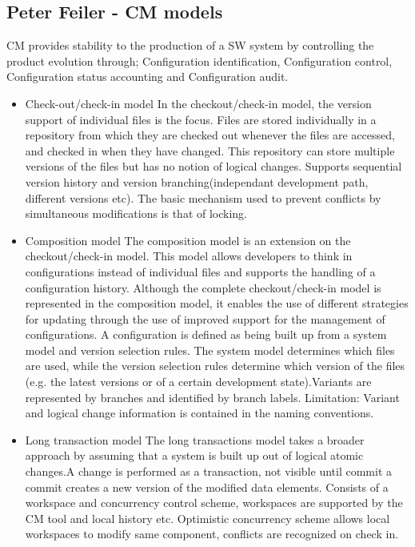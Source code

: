 \subsection{Peter Feiler - CM models}
CM provides stability to the production of a SW system by controlling the product evolution through; Configuration identification, Configuration control, Configuration status accounting and Configuration audit.
\begin{itemize}
    \item Check-out/check-in model
    In the checkout/check-in model, the version support of individual files is the focus. Files are stored individually in a repository from which they are checked out whenever the files are accessed, and checked in when they have changed.
    This repository can store multiple versions of the files but has no notion of logical changes. Supports sequential version history and version branching(independant development path, different versions etc).
    The basic mechanism used to prevent conflicts by simultaneous modifications is that of locking.
    \item Composition model 
    The composition model is an extension on the checkout/check-in model. This model allows developers to think in configurations instead of individual files and supports the handling of a configuration history.
    Although the complete checkout/check-in model is represented in the composition model, it enables the use of different strategies for updating through the use of
    improved support for the management of configurations. A configuration is defined as being built up from a system model and version selection rules.
    The system model determines which files are used, while the version selection rules determine which version of the files (e.g. the latest versions or of a certain development state).Variants are represented by branches
    and identified by branch labels. Limitation:  Variant and logical change information is contained in the naming conventions.
    \item Long transaction model
    The long transactions model takes a broader approach by assuming that a system is built up out of logical atomic changes.A change is performed as a transaction, not visible until commit a commit creates a new version
    of the modified data elements. Consists of a workspace and concurrency control scheme, workspaces are supported by the CM tool and local history etc. Optimistic concurrency scheme allows local workspaces to 
    modify same component, conflicts are recognized on check in.

\end{itemize}
